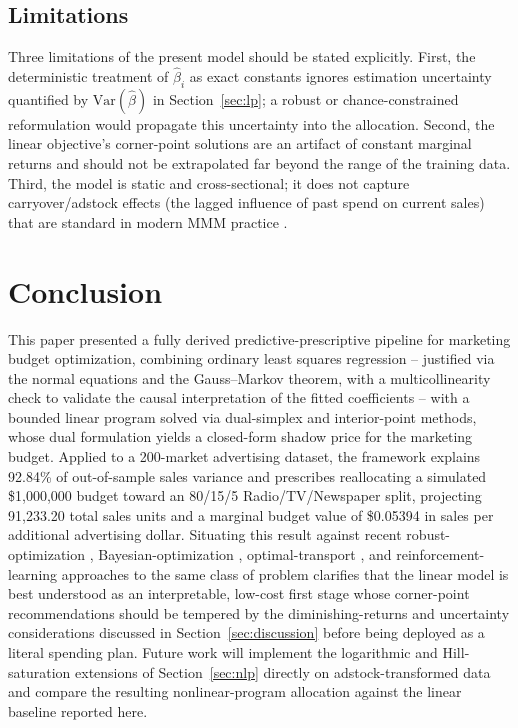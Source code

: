 \documentclass[conference]{IEEEtran}
\begin{document}
\subsection{Limitations}
Three limitations of the present model should be stated explicitly. First, the deterministic treatment of $\hat\beta_i$ as exact constants ignores estimation uncertainty quantified by $\mathrm{Var}(\hat\beta)$ in Section~\ref{sec:lp}; a robust or chance-constrained reformulation \cite{robust_lp_2025} would propagate this uncertainty into the allocation. Second, the linear objective's corner-point solutions are an artifact of constant marginal returns and should not be extrapolated far beyond the range of the training data. Third, the model is static and cross-sectional; it does not capture carryover/adstock effects (the lagged influence of past spend on current sales) that are standard in modern MMM practice \cite{mmm_adstock}.

\section{Conclusion}
This paper presented a fully derived predictive-prescriptive pipeline for marketing budget optimization, combining ordinary least squares regression -- justified via the normal equations and the Gauss--Markov theorem, with a multicollinearity check to validate the causal interpretation of the fitted coefficients -- with a bounded linear program solved via dual-simplex and interior-point methods, whose dual formulation yields a closed-form shadow price for the marketing budget. Applied to a 200-market advertising dataset, the framework explains 92.84\% of out-of-sample sales variance and prescribes reallocating a simulated \$1,000,000 budget toward an 80/15/5 Radio/TV/Newspaper split, projecting 91{,}233.20 total sales units and a marginal budget value of \$0.05394 in sales per additional advertising dollar. Situating this result against recent robust-optimization \cite{robust_lp_2025}, Bayesian-optimization \cite{bora_2022}, optimal-transport \cite{adcob_2023}, and reinforcement-learning \cite{danaei_2026,li_ieee_access_2024} approaches to the same class of problem clarifies that the linear model is best understood as an interpretable, low-cost first stage whose corner-point recommendations should be tempered by the diminishing-returns and uncertainty considerations discussed in Section~\ref{sec:discussion} before being deployed as a literal spending plan. Future work will implement the logarithmic and Hill-saturation extensions of Section~\ref{sec:nlp} directly on adstock-transformed data and compare the resulting nonlinear-program allocation against the linear baseline reported here.
\end{document}
